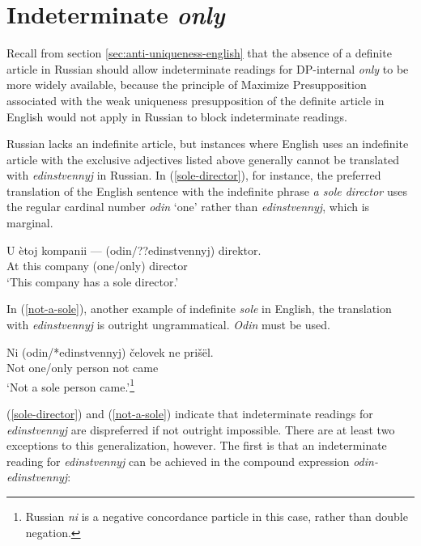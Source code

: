 \section{Indeterminate \textit{only} \label{sec:indeterminate-only}}
Recall from section \ref{sec:anti-uniqueness-english} that the absence of a definite article in Russian should allow indeterminate readings for DP-internal \textit{only} to be more widely available, because the principle of Maximize Presupposition associated with the weak uniqueness presupposition of the definite article in English would not apply in Russian to block indeterminate readings.

Russian lacks an indefinite article, but instances where English uses an indefinite article with the exclusive adjectives listed above generally cannot be translated with \textit{edinstvennyj} in Russian. In (\ref{sole-director}), for instance, the preferred translation of the English sentence with the indefinite phrase \textit{a sole director} uses the regular cardinal number \textit{odin} `one' rather than \textit{edinstvennyj}, which is marginal.

\begin{exe}
	\ex \label{sole-director} \gll U \`{e}toj kompanii --- (odin/??edinstvennyj) direktor.\\
	At this company {} (one/only) director\\
	\glt `This company has a sole director.'
\end{exe}

In (\ref{not-a-sole}), another example of indefinite \textit{sole} in English, the translation with \textit{edinstvennyj} is outright ungrammatical. \textit{Odin} must be used.

\begin{exe}
	\ex \label{not-a-sole} \gll Ni (odin/*edinstvennyj) \v{c}elovek ne pri\v{s}\"{e}l.\\
	Not one/only person not came\\
	\glt `Not a sole person came.'\footnote{Russian \textit{ni} is a negative concordance particle in this case, rather than double negation.}
\end{exe}

(\ref{sole-director}) and (\ref{not-a-sole}) indicate that indeterminate readings for \textit{edinstvennyj} are dispreferred if not outright impossible. There are at least two exceptions to this generalization, however. The first is that an indeterminate reading for \textit{edinstvennyj} can be achieved in the compound expression \textit{odin-edinstvennyj}:

